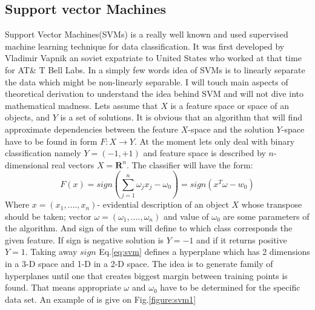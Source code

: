 \subsection{Support vector Machines}
Support Vector Machines(SVMs) is a really well known and used supervised machine learning technique for data classification. It was first developed by Vladimir Vapnik\cite{vapnick} an soviet expatriate to United States who worked at that time for AT\& T Bell Labs. In a simply few words idea of SVMs is to linearly separate the data which might be non-linearly separable. I will touch main aspects of theoretical derivation to understand the idea behind SVM and will not dive into mathematical madness.
Lets assume that $X$ is a feature space or space of an objects, and $Y$ is a set of solutions. It is obvious that an algorithm that will find approximate dependencies between the feature $X$-space and the solution $Y$-space have to be found in form $F:X\rightarrow Y$.  At the moment lets only deal with binary classification    namely $Y=(-1,+1)$ and feature space is described by $n$-dimensional real vectors $X=\mathbf{R}^n$. 
The classifier will have the form: 
\begin{equation}\label{eq:svm}
F(x)=sign(\sum_{j=1}^{n} \omega_j x_j-\omega_0)=sign(x^{T}\omega-w_0)
\end{equation}
Where $x=(x_1,....,x_n)$- evidential description of an object $X$ whose transpose should be taken; vector $\omega=(\omega_1,....,\omega_n)$ and value of $\omega_0$ are some parameters of the algorithm. And sign of the sum will define to which class corresponds the given feature. If sign is negative solution is $Y=-1$ and if it returns positive $Y=1$. Taking away $sign$ Eq.\ref{eq:svm} defines a hyperplane which has 2 dimensions in a 3-D space and 1-D in a 2-D space. The idea is to generate family of hyperplanes until one that creates biggest margin between training points is found. That means appropriate $\omega$ and $\omega_0$ have to be determined for the specific data set. An example of is give on Fig.\ref{figure:svm1}    
